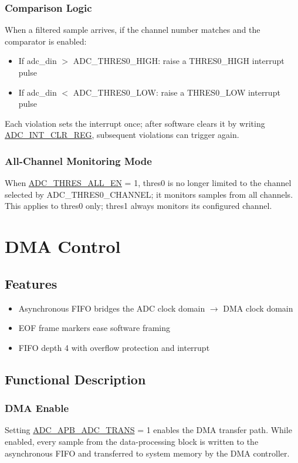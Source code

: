 \documentclass[main\_\_EN.tex]{subfiles}
\begin{document}
\subsubsection{Comparison Logic}
When a filtered sample arrives, if the channel number matches and the comparator is enabled:
\begin{itemize}
    \item If adc\_din $>$ ADC\_THRES0\_HIGH: raise a THRES0\_HIGH interrupt pulse
    \item If adc\_din $<$ ADC\_THRES0\_LOW: raise a THRES0\_LOW interrupt pulse
\end{itemize}
Each violation sets the interrupt once; after software clears it by writing \hyperref[regdesc:ADCINTCLRREG]{ADC\_INT\_CLR\_REG}, subsequent violations can trigger again.

\subsubsection{All-Channel Monitoring Mode}
When \hyperref[fielddesc:ADCTHRESALLEN]{ADC\_THRES\_ALL\_EN} = 1, thres0 is no longer limited to the channel selected by ADC\_THRES0\_CHANNEL; it monitors samples from all channels. This applies to thres0 only; thres1 always monitors its configured channel.


\section{DMA Control}
\label{sec:adc-dma}

\subsection{Features}
\begin{itemize}
    \item Asynchronous FIFO bridges the ADC clock domain $\to$ DMA clock domain
    \item EOF frame markers ease software framing
    \item FIFO depth 4 with overflow protection and interrupt
\end{itemize}

\subsection{Functional Description}
\label{sec:adc-dma-func-descr}

\subsubsection{DMA Enable}
Setting \hyperref[fielddesc:ADCAPBADCTRANS]{ADC\_APB\_ADC\_TRANS} = 1 enables the DMA transfer path. While enabled, every sample from the data-processing block is written to the asynchronous FIFO and transferred to system memory by the DMA controller.
\end{document}
